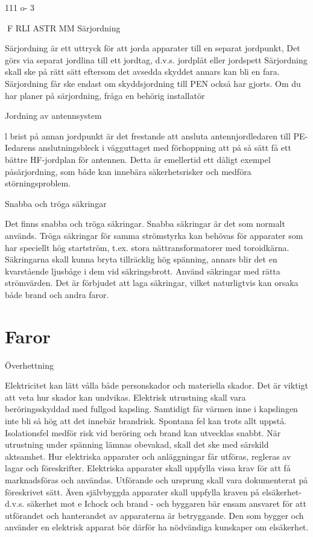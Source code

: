 \documentclass[a4paper,twoside,twocolumn,openright]{book}
\begin{document}
{{{{{111 o- 3

F RLI ASTR MM
Särjordning

Särjordning är ett uttryck för att jorda apparater till en separat jordpunkt, Det görs via
separat jordlina till ett jordtag, d.v.s. jordplåt
eller jordspett Särjordning skall ske på rätt
sätt eftersom det avsedda skyddet annars
kan bli en fara.
Särjordning får ske endast om skyddsjordning till PEN också har gjorts. Om du har
planer på särjordning, fråga en behörig installatör

Jordning av antennsystem

l brist på annan jordpunkt är det frestande att
ansluta antennjordledaren till PE-Iedarens
anslutningsbleck i vägguttaget med förhoppning att på så sätt få ett bättre HF-jordplan för
antennen. Detta är emellertid ett dåligt exempel påsärjordning, som både kan innebära säkerhetsrisker och medföra störningsproblem.

Snabba och tröga säkringar

Det finns snabba och tröga säkringar. Snabba
säkringar är det som normalt används. Tröga
säkringar för samma strömstyrka kan behövas för apparater som har speciellt hög startström, t.ex. stora nättransformatorer med
toroidkärna. Säkringarna skall kunna bryta
tillräcklig hög spänning, annars blir det en
kvarstående ljusbåge i dem vid säkringsbrott. Använd säkringar med rätta strömvärden. Det är förbjudet att laga säkringar,
vilket naturligtvis kan orsaka både brand och
andra faror.

\section{Faror}

Överhettning

Elektricitet kan lätt vålla både personskador
och materiella skador. Det är viktigt att veta
hur skador kan undvikas. Elektrisk utrustning skall vara beröringsskyddad med fullgod kapsling. Samtidigt får värmen inne i
kapslingen inte bli så hög att det innebär
brandrisk. Spontana fel kan trots allt uppstå.
Isolationsfel medför risk vid beröring och
brand kan utvecklas snabbt. När utrustning
under spänning lämnas obevakad, skall det
ske med särskild aktsamhet.
Hur elektriska apparater och anläggningar får utföras, regleras av lagar och föreskrifter. Elektriska apparater skall uppfylla
vissa krav för att få marknadsföras och användas. Utförande och ursprung skall vara
dokumenterat på föreskrivet sätt.
Även självbyggda apparater skall uppfylla kraven på elsäkerhet- d.v.s. säkerhet
mot e Ichock och brand - och byggaren bär
ensam ansvaret för att utförandet och
hanterandet av apparaterna är betryggande.
Den som bygger och använder en elektrisk apparat bör därför ha nödvändiga kunskaper om elsäkerhet.

}}}}}
\end{document}
